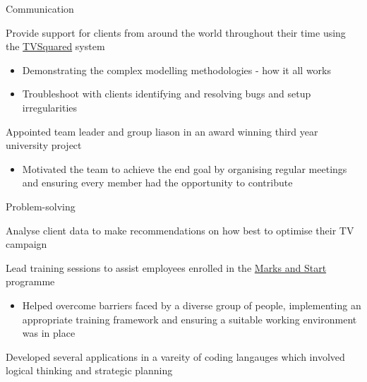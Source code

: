 \begin{cventries}
\cventry
    {Communication}
    {}
    {}
    {}
    {
      \begin{cvitems}
      \item {Provide support for clients from around the world throughout their time using the \href{http://tvsquared.com/}{TVSquared} system}
       \vspace{1mm}
       	\begin{itemize}
       		 \item Demonstrating the complex modelling methodologies - how it all works
       		 \vspace{.5mm}
             \item Troubleshoot with clients identifying and resolving bugs and setup irregularities
      	 \end{itemize}
       \item {Appointed team leader and group liason in an award winning third year university project}
       \vspace{1mm}
       	\begin{itemize}
      	 \item Motivated the team to achieve the end goal by organising regular meetings and ensuring every member
       		 had the opportunity to contribute
      	 \end{itemize}
        \end{cvitems}
      }
     \cventry
    {Problem-solving}
    {}
    {}
    {}
    {
      \begin{cvitems}
      \item {Analyse client data to make recommendations on how best to optimise their TV campaign}
      \item {Lead training sessions to assist employees enrolled in the  \href{http://careers.marksandspencer.com/helping-you-find-work}{Marks and Start} programme}
      \vspace{1mm}
       	\begin{itemize}
       	\item Helped overcome barriers faced by a diverse group of people, implementing an appropriate training framework and ensuring a suitable working environment was in place
       \end{itemize}
      \item {Developed several applications in a vareity of coding langauges which involved logical thinking and strategic planning}
      \vspace{1mm}

\end{cvitems}}
\end{cventries}
